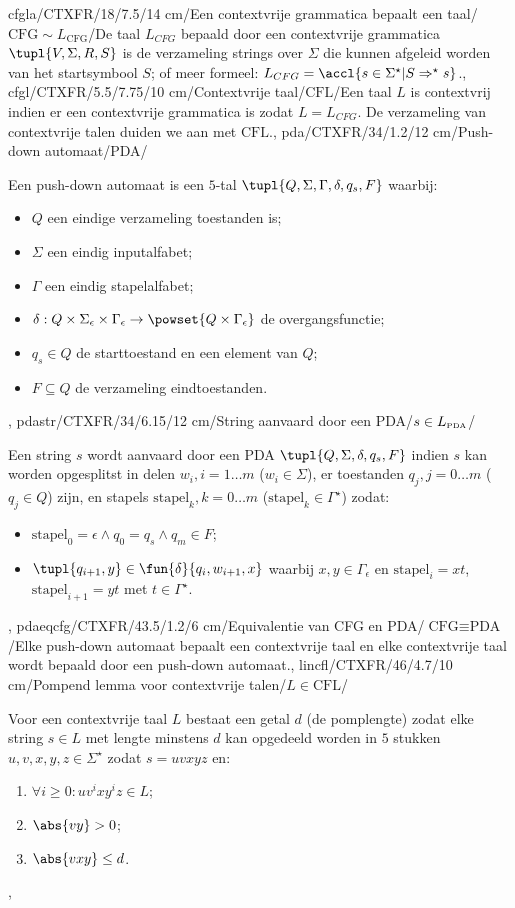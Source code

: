 cfgla/CTXFR/18/7.5/14 cm/Een contextvrije grammatica bepaalt een taal/$\mbox{CFG}\sim L_{\mbox{CFG}}$/{De taal $L_{CFG}$ bepaald door een contextvrije grammatica $\tupl{V,\Sigma,R,S}$ is de verzameling strings over $\Sigma$ die kunnen afgeleid worden van het startsymbool $S$; of meer formeel: $L_{CFG}=\accl{s\in\Sigma^{\star}|S\Rightarrow^{\star}s}$.},
cfgl/CTXFR/5.5/7.75/10 cm/Contextvrije taal/$\mbox{CFL}$/{Een taal $L$ is contextvrij indien er een contextvrije grammatica is zodat $L=L_{CFG}$. De verzameling van contextvrije talen duiden we aan met $\mbox{CFL}$.},
pda/CTXFR/34/1.2/12 cm/Push-down automaat/PDA/{Een push-down automaat is een $5$-tal $\tupl{Q,\Sigma,\Gamma,\delta,q_s,F}$ waarbij:\begin{itemize}
 \item $Q$ een eindige verzameling toestanden is;
 \item $\Sigma$ een eindig inputalfabet;
 \item $\Gamma$ een eindig stapelalfabet;
 \item $\delta:Q\times\Sigma_{\epsilon}\times\Gamma_{\epsilon}\rightarrow\powset{Q\times\Gamma_{\epsilon}}$ de overgangsfunctie;
 \item $q_s\in Q$ de starttoestand en een element van $Q$;
 \item $F\subseteq Q$ de verzameling eindtoestanden.
\end{itemize}},
pdastr/CTXFR/34/6.15/12 cm/String aanvaard door een PDA/$s\in L_{\mbox{\tiny PDA}}$/{Een string $s$ wordt aanvaard door een PDA $\tupl{Q,\Sigma,\delta,q_s,F}$ indien $s$ kan worden opgesplitst in
delen $w_i,i=1\ldots m$ ($w_i\in\Sigma$), er toestanden $q_j,j=0\ldots m$ ($q_j\in Q$) zijn, en stapels $\mbox{stapel}_k,k=0\ldots m$ ($\mbox{stapel}_k\in\Gamma^{\star}$) zodat:\begin{itemize}
 \item $\mbox{stapel}_0=\epsilon\wedge q_0=q_s\wedge q_m\in F$;
 \item $\tupl{q_{i+1},y}\in\fun{\delta}{q_i,w_{i+1},x}$ waarbij $x,y\in\Gamma_{\epsilon}$ en $\mbox{stapel}_i=xt$, $\mbox{stapel}_{i+1}=yt$ met $t\in\Gamma^{\star}$.
\end{itemize}},
pdaeqcfg/CTXFR/43.5/1.2/6 cm/Equivalentie van CFG en PDA/$\mbox{CFG}\equiv\mbox{PDA}$/{Elke push-down automaat bepaalt een contextvrije taal en elke contextvrije taal wordt bepaald door een push-down automaat.},
lincfl/CTXFR/46/4.7/10 cm/Pompend lemma voor contextvrije talen/$L\in\mbox{CFL}$/{Voor een contextvrije taal $L$ bestaat een getal $d$ (de pomplengte) zodat elke string $s\in L$ met lengte minstens $d$ kan opgedeeld worden in $5$ stukken $u,v,x,y,z\in\Sigma^{\star}$ zodat $s=uvxyz$ en:
\begin{enumerate}
 \item $\forall i\geq 0:uv^ixy^iz\in L$;
 \item $\abs{vy}>0$;
 \item $\abs{vxy}\leq d$.
\end{enumerate}},
